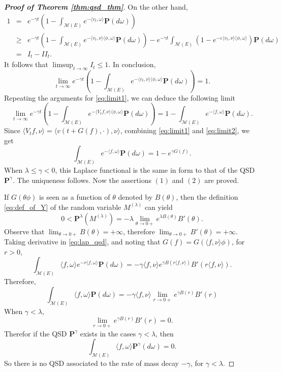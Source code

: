 \documentclass[12pt,a4paper]{amsart}
\numberwithin{equation}{section}
\theoremstyle{plain}
\theoremstyle{definition}
\begin{document}
\begin{proof}[{\bf Proof of Theorem \ref{thm:qsd_thm}}]
  On the other hand,
  \begin{eqnarray*}
    1&=&e^{-\gamma t}\left(1-\int_{\mathcal M(E)}e^{-\langle v_t,\omega\rangle }\mathbf P(d\omega)\right)\\
     &\geq &e^{-\gamma t}\left(1-\int_{\mathcal M(E)}e^{-\langle v_t,\nu\rangle\langle\phi,\omega\rangle }\mathbf P(d\omega)\right)-e^{-\gamma t}\int_{\mathcal M(E)}\left(1-e^{-\varepsilon\langle v_t,\nu\rangle\langle\phi,\omega\rangle  }\right)\mathbf P(d\omega)\\
     &=&I_t-II_t.
  \end{eqnarray*}
  It follows that $\limsup_{t\to\infty}I_t\leq 1$. In conclusion,
  \begin{equation}\label{eq:limit1}
    \lim_{t\rightarrow\infty}e^{-\gamma t}\left(1-\int_{\mathcal M(E)}e^{-\langle v_t,\nu\rangle\langle\phi,\omega\rangle }\mathbf P(d\omega)\right)=1.
  \end{equation}
  Repeating the arguments for \eqref{eq:limit1}, we can deduce the following limit
  \begin{equation}\label{eq:limit2}
    \lim_{t\rightarrow\infty}e^{-\gamma t}\left(1-\int_{\mathcal M(E)}e^{-\langle V_tf,\nu\rangle \langle \phi,\omega\rangle }\mathbf P(d\omega)\right)=1-\int_{\mathcal M(E)}e^{-\langle f,\omega\rangle }\mathbf P(d\omega).
  \end{equation}
  Since $\langle V_tf,\nu\rangle =\langle v(t+G(f),\cdot),\nu\rangle $, combining \eqref{eq:limit1} and \eqref{eq:limit2}, we get
  \begin{equation}\label{eq:lap_qsd}
    \int_{\mathcal M(E)}e^{-\langle f,\omega\rangle }\mathbf P(d\omega)=1-e^{\gamma G(f)}.
  \end{equation}
  When  $\lambda\leq\gamma<0$, this Laplace functional is the same in form to that of the QSD $\mathbf P^{\gamma}$.  The uniqueness follows.  Now the assertions $(1)$ and $(2)$ are proved.

  If $G(\theta\phi)$ is seen as a function of $\theta$ denoted by $B(\theta)$, then the definition \eqref{eq:def_of_Y} of the
  random variable $M^{(\lambda)}$ can yield
  \[
    0<\mathbf P^{\lambda}(M^{(\lambda)})=-\lambda\lim_{\theta\rightarrow 0+} e^{\lambda B(\theta)}B'(\theta).
  \]
  Observe that $\lim_{\theta\rightarrow 0+} B(\theta)=+\infty$, therefore $\lim_{\theta\rightarrow 0+}B'(\theta)=+\infty$. Taking derivative in \eqref{eq:lap_qsd},
  and noting that $G(f)=G(\langle f,\nu\rangle\phi)$, for $r>0$,
  \[
    \int_{\mathcal M(E)}\langle f,\omega\rangle e^{-r\langle f,\omega\rangle }\mathbf P(d\omega)
    =-\gamma \langle f,\nu\rangle  e^{\gamma B(r\langle f,\nu\rangle)}B'(r\langle f,\nu\rangle).
  \]
  Therefore,
  \[
    \int_{\mathcal M(E)}\langle f,\omega\rangle \mathbf P(d\omega)=-\gamma \langle f,\nu\rangle  \lim_{r\rightarrow 0+}e^{\gamma B(r)}B'(r)
  \]
  When $\gamma<\lambda$,
  \[
    \lim_{r\rightarrow 0+}e^{\gamma B(r)}B'(r)=0.
  \]
  Therefor if the QSD $\mathbf P^{\gamma}$ exists in the cases $\gamma<\lambda$, then
  \[
    \int_{\mathcal M(E)}\langle f,\omega\rangle \mathbf P^{\gamma}(d\omega)=0.
  \]
  So there is no QSD associated to the rate of mass decay $-\gamma$, for $\gamma<\lambda$.
\end{proof}
\end{document}
